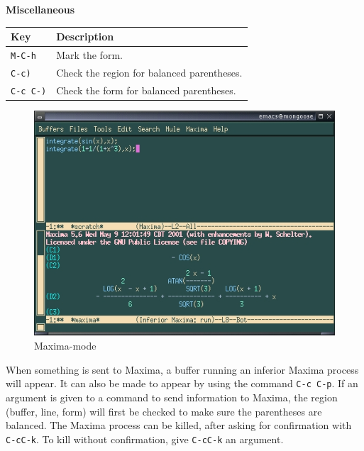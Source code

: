 \smallskip

\noindent
\textbf{Miscellaneous}

\smallskip

\noindent
\begin{tabular}{p{\firstcol}p{\secondcol}}
\hline
\textbf{Key} & \textbf{Description}\\
\hline
\texttt{M-C-h} & Mark the form.\\
\texttt{C-c)} & Check the region for balanced parentheses.\\
\texttt{C-c C-)} & Check the form for balanced parentheses.
\end{tabular}

\begin{figure}
\centering \includegraphics{images/emacsmaximamodeshot} 
\caption{Maxima-mode} 
\end{figure}

\noindent
When something is sent to Maxima, a buffer running an inferior Maxima 
process will appear.  It can also be made to appear by using the command
\texttt{C-c C-p}.
If an argument is given to a command to send information to Maxima,
the region (buffer, line, form) will first be checked to make sure
the parentheses are balanced.
The Maxima process can be killed, after asking for confirmation 
with \texttt{C-cC-k}.  To kill without confirmation, give \texttt{C-cC-k}
an argument.

